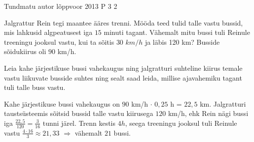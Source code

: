 {Tundmatu autor} %
{lõppvoor} %
{2013} %
{P 3} %
{2} %
{

\ifStatement
Jalgrattur Rein tegi maantee ääres trenni. Mööda teed tulid talle vastu bussid, mis lahkusid algpeatusest iga $15$ minuti tagant. Vähemalt mitu bussi tuli Reinule treeningu jooksul vastu, kui ta sõitis $30$ $km/h$ ja läbis 120 km? Busside sõidukiirus oli $90$ km/h.
\fi

\ifHint
Leia kahe järjestikuse bussi vahekaugus ning jalgratturi suhteline kiirus temale vastu liikuvate busside suhtes ning sealt saad leida, millise ajavahemiku tagant tuli talle buss vastu.
\fi

\ifSolution
Kahe järjestikuse bussi vahekaugus on $90$ km/h $\cdot$ $0,25$ h = $22,5$ km. Jalgratturi taustsüsteemis sõitsid bussid talle vastu kiirusega $120$ km/h, ehk Rein nägi bussi iga $\frac{22,5}{120} = \frac{3}{16}$ tunni järel. Trenn kestis $4h$, seega treeningu jooksul tuli Reinule vastu $\frac{4 \cdot 16}{3} \approx 21,33$ $\Rightarrow$ vähemalt $21$ bussi.
\fi
}